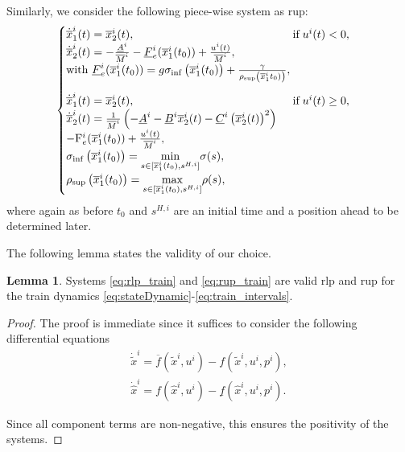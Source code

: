 \documentclass[letterpaper, 10 pt, conference]{ieeeconf}
\theoremstyle{definition}
\theoremstyle{nopoint}
\newtheorem{lemma}[theorem]{Lemma}
\begin{document}
Similarly, we consider the following piece-wise system as \gls{rup}:
\begin{equation}\label{eq:rup_train}
	\begin{cases}
		\dot{\overline{x}}_1^i(t) =   \overline{x}_2^i(t), \qquad  \qquad \qquad \qquad \qquad \qquad  \qquad  \text{if} \; u^i(t) < 0,  \\
		\dot{\overline{x}}_2^i(t) =  -\frac{\underline{A}^i}{\overline{M}^i}-\underline{F}_e^i(\overline{x}^i_1(t_0)) + \frac{u^i(t)}{\overline{M}^i}, \\
		\textrm{with } \underline{F}_e^i(\overline{x}^i_1(t_0)) =  g \sigma_{\inf}\left(\overline{x}^i_1(t_0)\right)+ \frac{\gamma}{\rho_{\sup}\left(\overline{x}^i_1t_0)\right)}, \\
		\noalign{\vskip9pt}
		\dot{\overline{x}}_1^i(t) =   \overline{x}_2^i(t), \qquad \qquad \qquad  \qquad \qquad \qquad \qquad \text{if} \; u^i(t) \geq 0,  \\
		\dot{\overline{x}}_2^i(t) =  \frac{1}{\overline{M}^i} \left(-\underline{A}^i - \underline{B}^i \overline{x}^i_2(t) -  \underline{C}^i \left(\overline{x}^i_2(t)\right)^2 \right) \\
		-  \mathrm{F}_e^i(\overline{x}^i_1(t_0))  + \frac{u^i(t)}{\overline{M}^i}, \\
		\sigma_{\inf}\left(\overline{x}^i_1(t_0)\right) = \underset{s \in [\overline{x}_1^i(t_0),s^{H,i}]}{\min} \sigma(s), \\
		\rho_{\sup}\left(\overline{x}^i_1(t_0)\right) = \underset{s \in [\overline{x}_1^i(t_0),s^{H,i}]}{\max} \rho(s),
	\end{cases}
\end{equation}
where again as before $t_0$ and $s^{H,i}$ are an initial time and a position ahead to be determined later.   


 
  
The following lemma states the validity of our choice. 
  
\begin{lemma} \label{lemma:Proxies}
Systems \eqref{eq:rlp_train} and \eqref{eq:rup_train} are valid \gls{rlp} and \gls{rup} for the train dynamics \eqref{eq:stateDynamic}\--\eqref{eq:train_intervals}. 
  \begin{proof}
The proof is immediate since it suffices to consider the 
following differential equations
\begin{align*}
	\dot{\tilde{x}}^i = \overline{f}\left(\tilde{x}^i, u^i \right) - f\left(\tilde{x}^i, u^i, p^i \right), \\
	\dot{\hat{x}}^i = f\left(\hat{x}^i, u^i \right) - \underline{f}\left(\hat{x}^i, u^i, p^i \right).
\end{align*}

Since all component terms are non-negative, this ensures the positivity of the systems.

  \end{proof}
\end{lemma}
\end{document}
